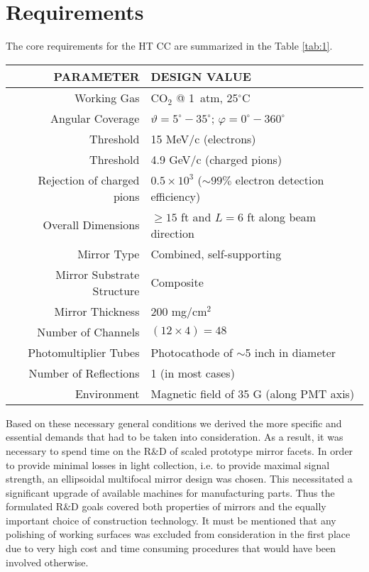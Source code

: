 \section{Requirements}

The core requirements for the HT CC are summarized in the Table \ref{tab:1}.

\begin{table*}[t]
	\centering
	\caption{Core requirements for HTCC design}
	\begin{tabular}{ | r | l | }
		\hline
		PARAMETER & DESIGN VALUE \\ 
		\hline
		Working Gas & CO$_2$ @ 1~atm, 25$^\circ$C  \\ 
		\hline
		Angular Coverage & $\vartheta = 5^\circ - 35^\circ$; $\varphi = 0^\circ - 360^\circ$ \\
		\hline
		Threshold & 15 MeV/c (electrons) \\
		\hline
		Threshold & 4.9 GeV/c (charged pions) \\
		\hline
		Rejection of charged pions & $0.5 \times 10^3$  ($\sim99\%$ electron detection efficiency)  \\
		\hline
		Overall Dimensions & $\geq 15$ ft and $L = 6$ ft along beam direction  \\
		\hline
		Mirror Type & Combined, self-supporting  \\
		\hline
		Mirror Substrate Structure & Composite  \\
		\hline
		Mirror Thickness & 200 mg/cm$^2$  \\
		\hline
		Number of Channels & $(12 \times 4) = 48$  \\
		\hline
		Photomultiplier Tubes & Photocathode of $\sim$5 inch in diameter  \\
		\hline
		Number of Reflections & 1 (in most cases)   \\
		\hline
		Environment & Magnetic field of 35 G (along PMT axis)   \\
		\hline
	\end{tabular}
	\label{tab:1}
\end{table*}
Based on these necessary general conditions we derived the more specific and essential demands that had to be taken into consideration. As a result, it was necessary to spend time on the R$\&$D of scaled prototype mirror facets. In order to provide minimal losses in light collection, i.e. to provide maximal signal strength, an ellipsoidal multifocal mirror design was chosen. This necessitated a significant upgrade of available machines for manufacturing parts. Thus the formulated R$\&$D goals covered both properties of mirrors and the equally important choice of construction technology. It must be mentioned that any polishing of working surfaces was excluded from consideration in the first place due to very high cost and time consuming procedures that would have been involved otherwise. \\
